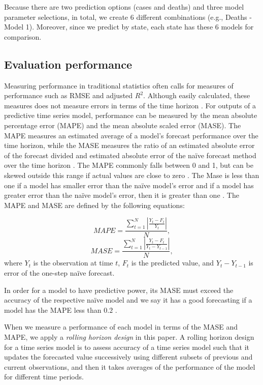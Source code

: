 Because there are two prediction options (cases and deaths) and three model parameter selections, in total, we create 6 different combinations (e.g., Deaths - Model 1). Moreover, since we predict by state, each state has these $6$ models for comparison.



\subsection{Evaluation performance}
\label{subsection:performance}

Measuring performance in traditional statistics often calls for measures of performance such as RMSE and adjusted $R^2$. Although easily calculated, these measures does not measure errors in terms of the time horizon \cite{Guo:2012}. For outputs of a predictive time series model, performance can be measured by the 
mean absolute percentage error (MAPE) and 
the mean absolute scaled error (MASE). The MAPE measures an estimated average of a model's forecast performance over the time horizon, while the MASE measures the ratio of an estimated absolute error of the forecast divided and estimated absolute error of the na\"ive forecast method over the time horizon \cite{hyndman2006another}. The MAPE commonly falls between 0 and 1, but can be skewed outside this range if actual values are close to zero \cite{hyndman2006another}. The Mase is less than one if a model has smaller error than the na\"ive model's error and if a model has greater error than the na\"ive model's error, then it is greater than one \cite{hyndman2006another}. The MAPE and MASE are defined by the following equations:

\begin{equation}
MAPE = \frac{\sum_{t=1}^{N}|\frac{Y_t-F_t}{Y_t}|}{N},
\end{equation}
\begin{equation}
MASE = \frac{\sum_{t=1}^{N}|\frac{Y_t-F_t}{Y_t-Y_{t-1}}|}{N},
\end{equation}
where $Y_t$ is the observation at time $t$, $F_t$ is the predicted value, and $Y_t-Y_{t-1}$ is error of the one-step na\"ive forecast.

In order for a model to have predictive power, its MASE must exceed the accuracy of the respective na\"ive model and we say it has a good forecasting if a model has the MAPE less than $0.2$ \cite{Lewis:1982}.

When we measure a performance of each model in terms of the MASE and MAPE, we apply a {\em rolling horizon design} \cite{10.2307/2630927} in this paper.  A rolling horizon design for a time series model is to assess accuracy of a time series model such that it updates the forecasted value successively using different subsets of previous and current observations, and then it takes averages of the performance of the model for different time periods.


